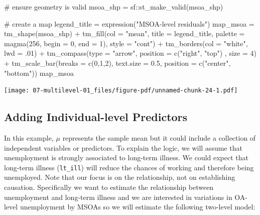 \documentclass[
  letterpaper,
  DIV=11,
  numbers=noendperiod,
  oneside]{scrreprt}
\newenvironment{Shaded}{\begin{snugshade}}{\end{snugshade}}
\newcommand{\AttributeTok}[1]{\textcolor[rgb]{0.40,0.45,0.13}{#1}}
\newcommand{\CommentTok}[1]{\textcolor[rgb]{0.37,0.37,0.37}{#1}}
\newcommand{\DecValTok}[1]{\textcolor[rgb]{0.68,0.00,0.00}{#1}}
\newcommand{\FloatTok}[1]{\textcolor[rgb]{0.68,0.00,0.00}{#1}}
\newcommand{\FunctionTok}[1]{\textcolor[rgb]{0.28,0.35,0.67}{#1}}
\newcommand{\NormalTok}[1]{\textcolor[rgb]{0.00,0.23,0.31}{#1}}
\newcommand{\OtherTok}[1]{\textcolor[rgb]{0.00,0.23,0.31}{#1}}
\newcommand{\SpecialCharTok}[1]{\textcolor[rgb]{0.37,0.37,0.37}{#1}}
\newcommand{\StringTok}[1]{\textcolor[rgb]{0.13,0.47,0.30}{#1}}
\begin{document}
\begin{Shaded}
\begin{Highlighting}[]
\CommentTok{\# ensure geometry is valid}
\NormalTok{msoa\_shp }\OtherTok{=}\NormalTok{ sf}\SpecialCharTok{::}\FunctionTok{st\_make\_valid}\NormalTok{(msoa\_shp)}

\CommentTok{\# create a map}
\NormalTok{legend\_title }\OtherTok{=} \FunctionTok{expression}\NormalTok{(}\StringTok{"MSOA{-}level residuals"}\NormalTok{)}
\NormalTok{map\_msoa }\OtherTok{=} \FunctionTok{tm\_shape}\NormalTok{(msoa\_shp) }\SpecialCharTok{+}
  \FunctionTok{tm\_fill}\NormalTok{(}\AttributeTok{col =} \StringTok{"mean"}\NormalTok{, }\AttributeTok{title =}\NormalTok{ legend\_title, }\AttributeTok{palette =} \FunctionTok{magma}\NormalTok{(}\DecValTok{256}\NormalTok{, }\AttributeTok{begin =} \DecValTok{0}\NormalTok{, }\AttributeTok{end =} \DecValTok{1}\NormalTok{), }\AttributeTok{style =} \StringTok{"cont"}\NormalTok{) }\SpecialCharTok{+} 
  \FunctionTok{tm\_borders}\NormalTok{(}\AttributeTok{col =} \StringTok{"white"}\NormalTok{, }\AttributeTok{lwd =}\NormalTok{ .}\DecValTok{01}\NormalTok{)  }\SpecialCharTok{+} 
  \FunctionTok{tm\_compass}\NormalTok{(}\AttributeTok{type =} \StringTok{"arrow"}\NormalTok{, }\AttributeTok{position =} \FunctionTok{c}\NormalTok{(}\StringTok{"right"}\NormalTok{, }\StringTok{"top"}\NormalTok{) , }\AttributeTok{size =} \DecValTok{4}\NormalTok{) }\SpecialCharTok{+} 
  \FunctionTok{tm\_scale\_bar}\NormalTok{(}\AttributeTok{breaks =} \FunctionTok{c}\NormalTok{(}\DecValTok{0}\NormalTok{,}\DecValTok{1}\NormalTok{,}\DecValTok{2}\NormalTok{), }\AttributeTok{text.size =} \FloatTok{0.5}\NormalTok{, }\AttributeTok{position =}  \FunctionTok{c}\NormalTok{(}\StringTok{"center"}\NormalTok{, }\StringTok{"bottom"}\NormalTok{)) }
\NormalTok{map\_msoa}
\end{Highlighting}
\end{Shaded}

\texttt{[image: 07-multilevel-01\_files/figure-pdf/unnamed-chunk-24-1.pdf]}

\subsection{Adding Individual-level Predictors}\label{sec-indlevel}

In this example, \(\mu\) represents the sample mean but it could include
a collection of independent variables or predictors. To explain the
logic, we will assume that unemployment is strongly associated to
long-term illness. We could expect that long-term illness
(\texttt{lt\_ill}) will reduce the chances of working and therefore
being unemployed. Note that our focus is on the relationship, not on
establishing causation. Specifically we want to estimate the
relationship between unemployment and long-term illness and we are
interested in variations in OA-level unemployment by MSOAs so we will
estimate the following two-level model:
\end{document}
